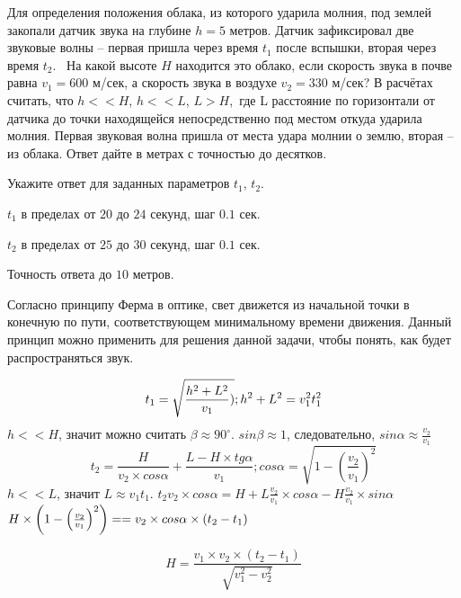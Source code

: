 
Для определения положения облака, из которого ударила
молния, под землей закопали датчик звука на глубине $h=5$ метров. Датчик 
зафиксировал две звуковые волны – первая пришла через время $t_1$ после
вспышки, вторая через время $t_2$.  На какой
высоте $H$ находится это облако,
если скорость звука в почве равна \linebreak $v_1 = 600$ м/сек, а скорость
звука в воздухе $v_2 = 330$ м/сек? В расчётах
считать, что $h << H$, $h << L$, $L >  H$, где L расстояние по горизонтали от датчика до точки находящейся непосредственно под местом откуда ударила молния. Первая
звуковая волна пришла от места удара молнии о землю, вторая – из облака. Ответ дайте в метрах с точностью до десятков.


Укажите ответ для заданных параметров $ t_1$, $t_2$.

\paramSection

$t_1$ в пределах от $20$ до $24$ секунд, шаг  $0.1$ сек.  

$t_2$ в пределах от $25$ до $30$ секунд, шаг  $0.1$ сек.

Точность ответа  до $10$ метров.

\solutionSection

Согласно принципу Ферма в оптике, свет движется из начальной точки в конечную по пути, 
соответствующем минимальному времени движения. Данный принцип можно применить для решения данной задачи, 
чтобы понять, как будет распространяться звук.

$$t_1=\sqrt{\frac{h^2+L^2}{v_1} )}; \space h^2+L^2=v_1^2 t_1^2$$
$h<<H$, значит можно считать $\beta  \approx 90^{\circ}$. $sin\beta  \approx 1$, следовательно,  
$sin \alpha  \approx \frac{v_2}{v_1}$ 
$$t_2=\frac{H}{v_2  \times cos \alpha}+\frac{L-H \times tg \alpha }{v_1}; 
cos \alpha =\sqrt{1-\left(\frac{v_2}{v_1}\right)^2}$$
$h<<L$, значит $L \approx v_1 t_1$. $t_2 v_2 \times cos \alpha =H+L \frac{v_2}{v_1} \times cos \alpha -H \frac{v_2}{v_1} \times sin \alpha$  
$H \times \left(1-\left(\frac{v_2}{v_1} \right)^2 \right)= \linebreak = v_2 \times cos \alpha  \times (t_2-t_1 )$

$$H=\frac{v_1 \times v_2 \times (t_2-t_1 )}{\sqrt{v_1^2-v_2^2}}$$

